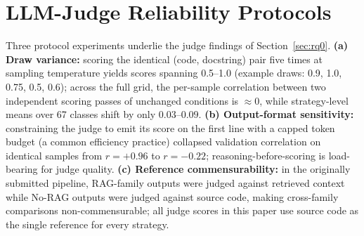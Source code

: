 \documentclass[pdflatex,sn-mathphys-ay]{sn-jnl}%
\theoremstyle{thmstyleone}%
\theoremstyle{thmstyletwo}%
\theoremstyle{thmstylethree}%
\begin{document}
\section{LLM-Judge Reliability Protocols}
\label{app:judge-reliability}
Three protocol experiments underlie the judge findings of Section~\ref{sec:rq0}.
\textbf{(a) Draw variance:} scoring the identical (code, docstring) pair five times at sampling temperature yields scores spanning 0.5--1.0 (example draws: 0.9, 1.0, 0.75, 0.5, 0.6); across the full grid, the per-sample correlation between two independent scoring passes of unchanged conditions is ${\approx}0$, while strategy-level means over 67 classes shift by only $0.03$--$0.09$.
\textbf{(b) Output-format sensitivity:} constraining the judge to emit its score on the first line with a capped token budget (a common efficiency practice) collapsed validation correlation on identical samples from $r=+0.96$ to $r=-0.22$; reasoning-before-scoring is load-bearing for judge quality.
\textbf{(c) Reference commensurability:} in the originally submitted pipeline, RAG-family outputs were judged against retrieved context while No-RAG outputs were judged against source code, making cross-family comparisons non-commensurable; all judge scores in this paper use source code as the single reference for every strategy.

\end{document}
